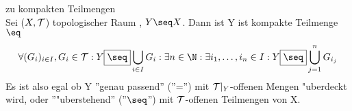 \begin{prop}\label{6.2} zu kompakten Teilmengen\\
Sei ($X,\mathcal T$) topologischer Raum , $Y\seq X$. Dann ist Y ist kompakte Teilmenge $\eq$
$$\forall (G_i)_{i\in I}, G_i\in\T :Y\framebox{$\seq$}\bigcup_{i\in I}G_i:\exists n\in\N: \exists i_1,\dots ,i_n\in I: Y\framebox{$\seq$}\bigcup_{j=1}^nG_{i_j}$$
Es ist also egal ob Y ''genau passend'' (''='') mit $\mathcal T |_Y$-offenen Mengen "uberdeckt wird, oder ''"uberstehend'' (''$\seq$'') mit $\mathcal T$-offenen Teilmengen von X.
\end{prop}
